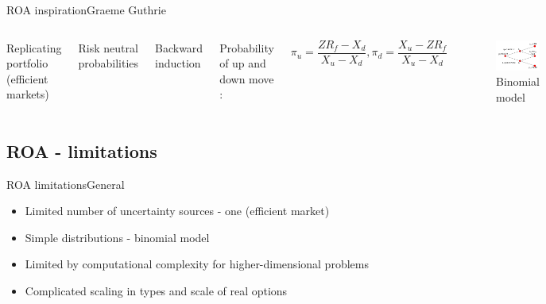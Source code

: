 \documentclass[us]{beamer}
\begin{document}
\begin{frame}{ROA inspiration}{Graeme Guthrie}
  \begin{itemize}
  	\begin{columns}
  		
  \item { Replicating portfolio (efficient markets) }
  \item { Risk neutral probabilities }
  \item { Backward induction }
  
  \item{Probability of up and down move \cite{Guthrie}: }
  
  \begin{equation}
  	\pi_u=\frac{ZR_f-X_d}{X_u-X_d}, \pi_d=\frac{X_u -ZR_f}{X_u-X_d}
  \end{equation}
  
  \begin{figure}
 \includegraphics[scale=0.3]{risk_neutral.png}
 \caption{Binomial model}
  \end{figure}
  
\end{columns}
  \end{itemize}
\end{frame}

\subsection{ROA - limitations}

\begin{frame}{ROA limitations}{General}
	\begin{itemize}
		\item {Limited number of uncertainty sources - one (efficient market)}
		\item {Simple distributions - binomial model}
		\item {Limited by computational complexity for higher-dimensional problems}
		\item {Complicated scaling in types and scale of real options}
	\end{itemize}
\end{frame}
\end{document}
